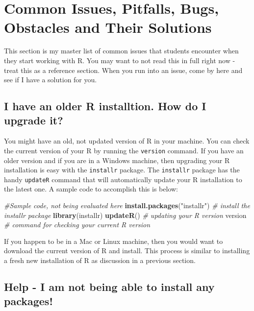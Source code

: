 \documentclass[]{krantz}
\makeatletter
\newenvironment{Shaded}{\begin{snugshade}}{\end{snugshade}}
\newcommand{\KeywordTok}[1]{\textcolor[rgb]{0.27,0.27,0.27}{\textbf{#1}}}
\newcommand{\StringTok}[1]{\textcolor[rgb]{0.5,0.5,0.5}{#1}}
\newcommand{\CommentTok}[1]{\textcolor[rgb]{0.56,0.35,0.01}{\textit{#1}}}
\newcommand{\NormalTok}[1]{#1}
\newenvironment{kframe}{%
\medskip{}
\setlength{\fboxsep}{.8em}
 \def\at@end@of@kframe{}%
 \ifinner\ifhmode%
  \def\at@end@of@kframe{\end{minipage}}%
  \begin{minipage}{\columnwidth}%
 \fi\fi%
 \def\FrameCommand##1{\hskip\@totalleftmargin \hskip-\fboxsep
 \colorbox{shadecolor}{##1}\hskip-\fboxsep
     \hskip-\linewidth \hskip-\@totalleftmargin \hskip\columnwidth}%
 \MakeFramed {\advance\hsize-\width
   \@totalleftmargin\z@ \linewidth\hsize
   \@setminipage}}%
 {\par\unskip\endMakeFramed%
 \at@end@of@kframe}
\renewenvironment{Shaded}{\begin{kframe}}{\end{kframe}}
\theoremstyle{definition}
\theoremstyle{definition}
\theoremstyle{definition}
\theoremstyle{remark}
\makeatother
\begin{document}
\section{Common Issues, Pitfalls, Bugs, Obstacles and Their
Solutions}\label{common-issues-pitfalls-bugs-obstacles-and-their-solutions}

This section is my master list of common issues that students encounter
when they start working with R. You may want to not read this in full
right now - treat this as a reference section. When you run into an
issue, come by here and see if I have a solution for you.

\subsection{I have an older R installtion. How do I upgrade
it?}\label{i-have-an-older-r-installtion.-how-do-i-upgrade-it}

You might have an old, not updated version of R in your machine. You can
check the current version of your R by running the \texttt{version}
command. If you have an older version and if you are in a Windows
machine, then upgrading your R installation is easy with the
\texttt{installr} package. The \texttt{installr} package has the handy
\texttt{updateR} command that will automatically update your R
installation to the latest one. A sample code to accomplish this is
below:

\begin{Shaded}
\begin{Highlighting}[]
\CommentTok{#Sample code, not being evaluated here}
\KeywordTok{install.packages}\NormalTok{(}\StringTok{"installr"}\NormalTok{) }\CommentTok{# install the installr package }
\KeywordTok{library}\NormalTok{(installr)}
\KeywordTok{updateR}\NormalTok{() }\CommentTok{# updating your R version}
\NormalTok{version }\CommentTok{# command for checking your current R version}
\end{Highlighting}
\end{Shaded}

If you happen to be in a Mac or Linux machine, then you would want to
download the current version of R and install. This process is similar
to installing a fresh new installation of R as discussion in a previous
section.

\subsection{Help - I am not being able to install any
packages!}\label{help---i-am-not-being-able-to-install-any-packages}
\end{document}
